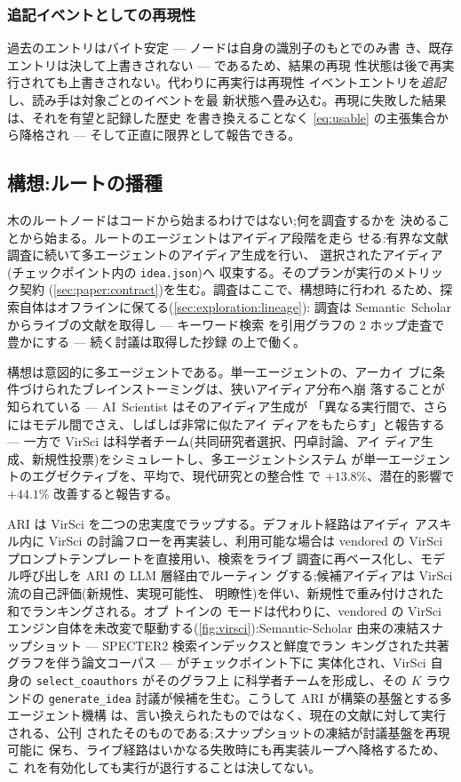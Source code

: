 \subsubsection*{追記イベントとしての再現性}

過去のエントリはバイト安定 — ノードは自身の識別子のもとでのみ書
き、既存エントリは決して上書きされない — であるため、結果の再現
性状態は後で再実行されても上書きされない。代わりに再実行は再現性
イベントエントリを\emph{追記}し、読み手は対象ごとのイベントを最
新状態へ畳み込む。再現に失敗した結果は、それを有望と記録した歴史
を書き換えることなく \cref{eq:usable} の主張集合から降格され —
そして正直に限界として報告できる。

\subsection{構想:ルートの播種}\label{sec:exploration:ideation}

木のルートノードはコードから始まるわけではない;何を調査するかを
決めることから始まる。ルートのエージェントはアイディア段階を走ら
せる:有界な文献調査に続いて多エージェントのアイディア生成を行い、
選択されたアイディア(チェックポイント内の \texttt{idea.json})へ
収束する。そのプランが実行のメトリック契約
(\cref{sec:paper:contract})を生む。調査はここで、構想時に行われ
るため、探索自体はオフラインに保てる(\cref{sec:exploration:lineage}):
調査は Semantic~Scholar からライブの文献を取得し — キーワード検索
を引用グラフの 2 ホップ走査で豊かにする — 続く討議は取得した抄録
の上で働く。

構想は意図的に多エージェントである。単一エージェントの、アーカイ
ブに条件づけられたブレインストーミングは、狭いアイディア分布へ崩
落することが知られている — AI~Scientist はそのアイディア生成が
「異なる実行間で、さらにはモデル間でさえ、しばしば非常に似たアイ
ディアをもたらす」と報告する \cite{lu2024ai} — 一方で VirSci
\cite{su2024many} は科学者チーム(共同研究者選択、円卓討論、アイ
ディア生成、新規性投票)をシミュレートし、多エージェントシステム
が単一エージェントのエグゼクティブを、平均で、現代研究との整合性
で $+13.8\%$、潜在的影響で $+44.1\%$ 改善すると報告する。

ARI は VirSci を二つの忠実度でラップする。デフォルト経路はアイディ
アスキル内に VirSci の討論フローを再実装し、利用可能な場合は
vendored の VirSci プロンプトテンプレートを直接用い、検索をライブ
調査に再ベース化し、モデル呼び出しを ARI の LLM 層経由でルーティン
グする;候補アイディアは VirSci 流の自己評価(新規性、実現可能性、
明瞭性)を伴い、新規性で重み付けされた和でランキングされる。オプ
トインの  モードは代わりに、vendored の VirSci
エンジン自体を未改変で駆動する(\cref{fig:virsci}):Semantic-Scholar
由来の凍結スナップショット — SPECTER2 検索インデックスと鮮度でラン
キングされた共著グラフを伴う論文コーパス — がチェックポイント下に
実体化され、VirSci 自身の \texttt{select\_coauthors} がそのグラフ上
に科学者チームを形成し、その $K$ ラウンドの \texttt{generate\_idea}
討議が候補を生む。こうして ARI が構築の基盤とする多エージェント機構
は、言い換えられたものではなく、現在の文献に対して実行される、公刊
されたそのものである;スナップショットの凍結が討議基盤を再現可能に
保ち、ライブ経路はいかなる失敗時にも再実装ループへ降格するため、こ
れを有効化しても実行が退行することは決してない。

